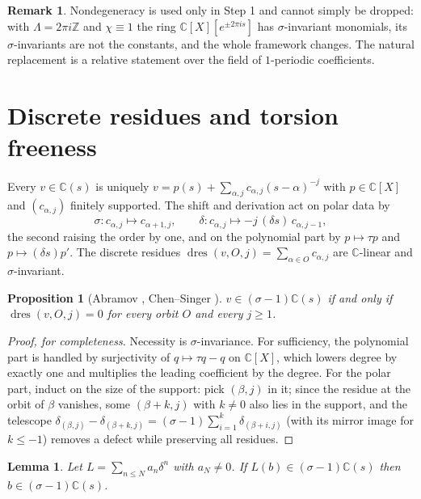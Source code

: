 \documentclass[11pt,a4paper]{amsart}
\theoremstyle{plain}
\newtheorem{proposition}[theorem]{Proposition}
\newtheorem{lemma}[theorem]{Lemma}
\theoremstyle{definition}
\newtheorem{remark}[theorem]{Remark}
\newcommand{\CC}{\mathbb{C}}
\newcommand{\ZZ}{\mathbb{Z}}
\newcommand{\sig}{\sigma}
\newcommand{\dd}{\delta}
\newcommand{\dres}{\operatorname{dres}}
\begin{document}
\begin{remark}
Nondegeneracy is used only in Step 1 and cannot simply be dropped: with $\Lambda=2\pi i\ZZ$ and
$\chi\equiv1$ the ring $\CC[X][e^{\pm2\pi is}]$ has $\sig$-invariant monomials, its
$\sig$-invariants are not the constants, and the whole framework changes. The natural replacement is
a relative statement over the field of $1$-periodic coefficients.
\end{remark}

\section{Discrete residues and torsion freeness}\label{sec:torsion}

Every $v\in\CC(s)$ is uniquely $v=p(s)+\sum_{\alpha,j}c_{\alpha,j}(s-\alpha)^{-j}$ with $p\in\CC[X]$
and $(c_{\alpha,j})$ finitely supported. The shift and derivation act on polar data by
\begin{equation}\label{eq:actions}
  \sig\colon c_{\alpha,j}\longmapsto c_{\alpha+1,j},\qquad
  \dd\colon c_{\alpha,j}\longmapsto -j\,(\dd s)\,c_{\alpha,j-1},
\end{equation}
the second raising the order by one, and on the polynomial part by $p\mapsto\tau p$ and
$p\mapsto(\dd s)p'$. The discrete residues $\dres(v,O,j)=\sum_{\alpha\in O}c_{\alpha,j}$ are
$\CC$-linear and $\sig$-invariant.

\begin{proposition}[Abramov \cite{Abramov1971}, Chen--Singer \cite{ChenSinger2012}]\label{prop:decide}
$v\in(\sig-1)\CC(s)$ if and only if $\dres(v,O,j)=0$ for every orbit $O$ and every $j\ge1$.
\end{proposition}

\begin{proof}[Proof, for completeness]
Necessity is $\sig$-invariance. For sufficiency, the polynomial part is handled by surjectivity of
$q\mapsto\tau q-q$ on $\CC[X]$, which lowers degree by exactly one and multiplies the leading
coefficient by the degree. For the polar part, induct on the size of the support: pick $(\beta,j)$ in
it; since the residue at the orbit of $\beta$ vanishes, some $(\beta+k,j)$ with $k\neq0$ also lies in
the support, and the telescope
$\delta_{(\beta,j)}-\delta_{(\beta+k,j)}=(\sig-1)\sum_{i=1}^{k}\delta_{(\beta+i,j)}$ (with its mirror
image for $k\le-1$) removes a defect while preserving all residues.
\end{proof}

\begin{lemma}\label{lem:torsion}
Let $L=\sum_{n\le N}a_n\dd^n$ with $a_N\neq0$. If $L(b)\in(\sig-1)\CC(s)$ then $b\in(\sig-1)\CC(s)$.
\end{lemma}
\end{document}

